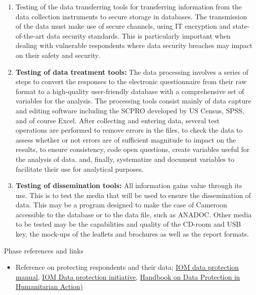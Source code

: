 \documentclass[
]{article}
\providecommand{\tightlist}{%
  \setlength{\itemsep}{0pt}\setlength{\parskip}{0pt}}
\begin{document}
\begin{enumerate}
\def\labelenumi{\arabic{enumi}.}
\setcounter{enumi}{314}
\item
  Testing of the data transferring tools for transferring information
  from the data collection instruments to secure storage in databases.
  The transmission of the data must make use of secure channels, using
  IT encryption and state-of-the-art data security standards. This is
  particularly important when dealing with vulnerable respondents
  where data security breaches may impact on their safety and
  security.
\item
  \textbf{Testing of data treatment tools:} The data processing involves a
  series of steps to convert the responses to the electronic
  questionnaire from their raw format to a high-quality user-friendly
  database with a comprehensive set of variables for the analysis. The
  processing tools consist mainly of data capture and editing software
  including the SCPRO developed by US Census, SPSS, and of course
  Excel. After collecting and entering data, several test operations
  are performed to remove errors in the files, to check the data to
  assess whether or not errors are of sufficient magnitude to impact
  on the results, to ensure consistency, code open questions, create
  variables useful for the analysis of data. and, finally, systematize
  and document variables to facilitate their use for analytical
  purposes.
\item
  \textbf{Testing of dissemination tools:} All information gains value
  through its use. This is to test the media that will be used to
  ensure the dissemination of data. This may be a program designed to
  make the case of Cameroon accessible to the database or to the data
  file, such as ANADOC. Other media to be tested may be the
  capabilities and quality of the CD-room and USB key, the mock-ups of
  the leaflets and brochures as well as the report formats.
\end{enumerate}

Phase references and links

\begin{itemize}
\tightlist
\item
  Reference on protecting respondents and their data; \href{https://publications.iom.int/books/iom-data-protection-manual}{IOM data
  protection
  manual},
  \href{https://www.iom.int/press-room}{IOM Data protection initiative},
  \href{https://www.icrc.org/en/publication/handbook-data-protection-humanitarian-action}{Handbook on Data Protection in Humanitarian
  Action)}
\end{itemize}
\end{document}
